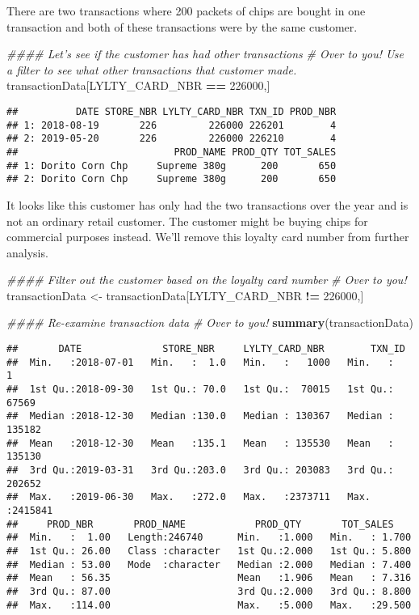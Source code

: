 \documentclass[]{article}
\newenvironment{Shaded}{\begin{snugshade}}{\end{snugshade}}
\newcommand{\CommentTok}[1]{\textcolor[rgb]{0.56,0.35,0.01}{\textit{#1}}}
\newcommand{\DecValTok}[1]{\textcolor[rgb]{0.00,0.00,0.81}{#1}}
\newcommand{\KeywordTok}[1]{\textcolor[rgb]{0.13,0.29,0.53}{\textbf{#1}}}
\newcommand{\NormalTok}[1]{#1}
\newcommand{\OperatorTok}[1]{\textcolor[rgb]{0.81,0.36,0.00}{\textbf{#1}}}
\newcommand{\StringTok}[1]{\textcolor[rgb]{0.31,0.60,0.02}{#1}}
\begin{document}
There are two transactions where 200 packets of chips are bought in one
transaction and both of these transactions were by the same customer.

\begin{Shaded}
\begin{Highlighting}[]
\CommentTok{#### Let's see if the customer has had other transactions}
\CommentTok{# Over to you! Use a filter to see what other transactions that customer made.}
\NormalTok{transactionData[LYLTY_CARD_NBR }\OperatorTok{==}\StringTok{ }\DecValTok{226000}\NormalTok{,]}
\end{Highlighting}
\end{Shaded}

\begin{verbatim}
##          DATE STORE_NBR LYLTY_CARD_NBR TXN_ID PROD_NBR
## 1: 2018-08-19       226         226000 226201        4
## 2: 2019-05-20       226         226000 226210        4
##                           PROD_NAME PROD_QTY TOT_SALES
## 1: Dorito Corn Chp     Supreme 380g      200       650
## 2: Dorito Corn Chp     Supreme 380g      200       650
\end{verbatim}

It looks like this customer has only had the two transactions over the
year and is not an ordinary retail customer. The customer might be
buying chips for commercial purposes instead. We'll remove this loyalty
card number from further analysis.

\begin{Shaded}
\begin{Highlighting}[]
\CommentTok{#### Filter out the customer based on the loyalty card number}
\CommentTok{# Over to you!}
\NormalTok{transactionData <-}\StringTok{ }\NormalTok{transactionData[LYLTY_CARD_NBR }\OperatorTok{!=}\StringTok{ }\DecValTok{226000}\NormalTok{,]}

\CommentTok{#### Re-examine transaction data}
\CommentTok{# Over to you!}
\KeywordTok{summary}\NormalTok{(transactionData)}
\end{Highlighting}
\end{Shaded}

\begin{verbatim}
##       DATE              STORE_NBR     LYLTY_CARD_NBR        TXN_ID       
##  Min.   :2018-07-01   Min.   :  1.0   Min.   :   1000   Min.   :      1  
##  1st Qu.:2018-09-30   1st Qu.: 70.0   1st Qu.:  70015   1st Qu.:  67569  
##  Median :2018-12-30   Median :130.0   Median : 130367   Median : 135182  
##  Mean   :2018-12-30   Mean   :135.1   Mean   : 135530   Mean   : 135130  
##  3rd Qu.:2019-03-31   3rd Qu.:203.0   3rd Qu.: 203083   3rd Qu.: 202652  
##  Max.   :2019-06-30   Max.   :272.0   Max.   :2373711   Max.   :2415841  
##     PROD_NBR       PROD_NAME            PROD_QTY       TOT_SALES     
##  Min.   :  1.00   Length:246740      Min.   :1.000   Min.   : 1.700  
##  1st Qu.: 26.00   Class :character   1st Qu.:2.000   1st Qu.: 5.800  
##  Median : 53.00   Mode  :character   Median :2.000   Median : 7.400  
##  Mean   : 56.35                      Mean   :1.906   Mean   : 7.316  
##  3rd Qu.: 87.00                      3rd Qu.:2.000   3rd Qu.: 8.800  
##  Max.   :114.00                      Max.   :5.000   Max.   :29.500
\end{verbatim}
\end{document}
